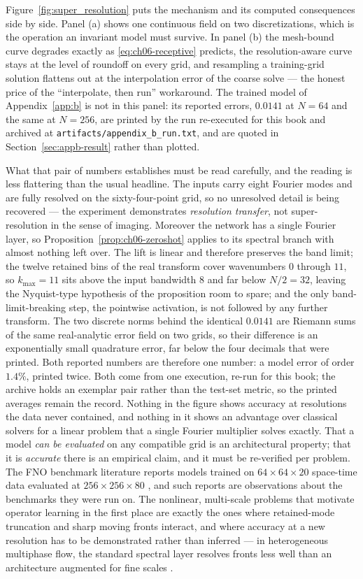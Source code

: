 Figure~\ref{fig:super_resolution} puts the mechanism and its computed consequences side by
side. Panel (a) shows one continuous field on two discretizations, which is the
operation an invariant model must survive. In panel (b) the mesh-bound curve
degrades exactly as \eqref{eq:ch06-receptive} predicts, the resolution-aware
curve stays at the level of roundoff on every grid, and resampling a
training-grid solution flattens out at the interpolation error of the coarse
solve --- the honest price of the ``interpolate, then run'' workaround. The trained model of Appendix~\ref{app:b} is not in this panel: its reported errors,
$0.0141$ at $N=64$ and the same at $N=256$, are printed by the run re-executed for this book and
archived at \texttt{artifacts/appendix\_b\_run.txt}, and are quoted in
Section~\ref{sec:appb-result} rather than plotted.

What that pair of numbers establishes must be read carefully, and the reading is
less flattering than the usual headline. The inputs carry eight Fourier modes
and are fully resolved on the sixty-four-point grid, so no unresolved detail is
being recovered --- the experiment demonstrates
\emph{resolution transfer}, not super-resolution
in the sense of imaging. Moreover the network has a single Fourier layer, so
Proposition~\ref{prop:ch06-zeroshot} applies to its spectral branch with almost
nothing left over. The lift is linear and therefore preserves the band limit;
the twelve retained bins of the real transform cover wavenumbers $0$ through
$11$, so $k_{\max}=11$ sits above the input bandwidth $8$ and far below
$N/2=32$, leaving the Nyquist-type hypothesis of the proposition room to spare;
and the only band-limit-breaking step, the pointwise activation, is not
followed by any further transform. The two discrete norms behind the
identical $0.0141$ are Riemann sums of the same real-analytic error field on
two grids, so their difference is an exponentially small quadrature error, far
below the four decimals that were printed. Both reported numbers are
therefore one number: a model error of order $1.4\%$, printed twice. Both come from one execution, re-run for this book; the archive holds an exemplar
pair rather than the test-set metric, so the printed averages remain the record.
Nothing in the figure shows accuracy at resolutions the data never contained,
and nothing in it shows an advantage over classical solvers for a linear problem
that a single Fourier multiplier solves exactly. That a model \emph{can be
evaluated} on any compatible grid is an architectural property; that it is
\emph{accurate} there is an empirical claim, and it must be re-verified per
problem. The FNO benchmark literature reports models trained on
$64\times64\times20$ space-time data evaluated at $256\times256\times80$
\cite{li2021fourier}, and such reports are observations about the benchmarks
they were run on. The nonlinear, multi-scale problems that motivate operator
learning in the first place are exactly the ones where retained-mode truncation
and sharp moving fronts interact, and where accuracy at a new resolution has to
be demonstrated rather than inferred --- in heterogeneous multiphase flow, the
standard spectral layer resolves fronts less well than an architecture
augmented for fine scales \cite{wen2022ufno}.

